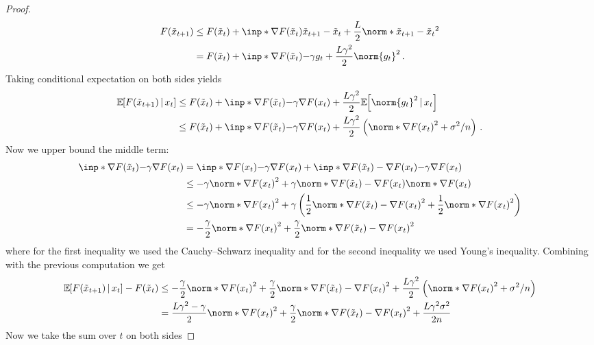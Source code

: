 \documentclass{article}
\begin{document}
\begin{proof}
\begin{align*}
    F(\tilde x_{t+1})
     & \leq
    F(\tilde x_t) + \inp*{\nabla F(\tilde x_t)}{\tilde x_{t+1} - \tilde x_t} + \frac{L}{2} \norm*{\tilde x_{t+1} - \tilde x_t}^2
    \\
     & =
    F(\tilde x_t) + \inp*{\nabla F(\tilde x_t)}{-\gamma g_t} + \frac{L \gamma^2}{2} \norm{g_t}^2
    \, .
  \end{align*}
  Taking conditional expectation on both sides yields
  \begin{align*}
    \expec{ F(\tilde x_{t+1}) \,|\, x_t}
     & \leq
    F(\tilde x_t) + \inp*{\nabla F(\tilde x_t)}{-\gamma \nabla F(x_t)} + \frac{L \gamma^2}{2} \expec{\norm{g_t}^2 \,|\, x_t}
    \\
     & \leq
    F(\tilde x_t) + \inp*{\nabla F(\tilde x_t)}{-\gamma \nabla F(x_t)} + \frac{L \gamma^2}{2} \left( \norm*{\nabla F(x_t)}^2  + \sigma^2/n\right)
    \, .
  \end{align*}
  Now we upper bound the middle term:
  \begin{align*}
    \inp*{\nabla F(\tilde x_t)}{-\gamma \nabla F(x_t)}
     & =
    \inp*{\nabla F(x_t)}{-\gamma \nabla F(x_t)} +   \inp*{\nabla F(\tilde x_t) - \nabla F(x_t)}{-\gamma \nabla F(x_t)}
    \\
     & \leq
    -\gamma \norm*{\nabla F(x_t)}^2 + \gamma \norm*{\nabla F(\tilde x_t) - \nabla F(x_t)} \norm*{\nabla F(x_t)}
    \\
     & \leq
    -\gamma \norm*{\nabla F(x_t)}^2 + \gamma \left( \frac{1}{2} \norm*{\nabla F(\tilde x_t) - \nabla F(x_t)}^2 + \frac{1}{2} \norm*{\nabla F(x_t)}^2 \right)
    \\
     & =
    -\frac{\gamma}{2} \norm*{\nabla F(x_t)}^2 + \frac{\gamma}{2} \norm*{\nabla F(\tilde x_t) - \nabla F(x_t)}^2
  \end{align*}
  where for the first inequality we used the Cauchy--Schwarz inequality and for the second inequality we used Young's inequality. Combining with the previous computation we get
  \begin{align*}
    \expec{ F(\tilde x_{t+1}) \,|\, x_t} - F(\tilde x_t)
     & \leq
    -\frac{\gamma}{2} \norm*{\nabla F(x_t)}^2 + \frac{\gamma}{2} \norm*{\nabla F(\tilde x_t) - \nabla F(x_t)}^2 + \frac{L \gamma^2}{2} \left( \norm*{\nabla F(x_t)}^2  + \sigma^2/n\right)
    \\
     & =
    \frac{L\gamma^2-\gamma}{2} \norm*{\nabla F(x_t)}^2 + \frac{\gamma}{2} \norm*{\nabla F(\tilde x_t) - \nabla F(x_t)}^2 + \frac{L \gamma^2 \sigma^2}{2n}
  \end{align*}
  Now we take the sum over $t$ on both sides

\end{proof}
\end{document}
